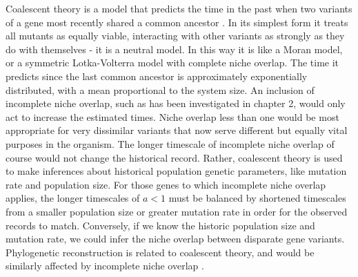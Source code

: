 Coalescent theory is a model that predicts the time in the past when two variants of a gene most recently shared a common ancestor \cite{Kingman1982,Rouzine2001,Blythe2007,Rogers2014}. 
In its simplest form it treats all mutants as equally viable, interacting with other variants as strongly as they do with themselves \cite{Ricklefs2006,Rosindell2011} - it is a neutral model. %
In this way it is like a Moran model, or a symmetric Lotka-Volterra model with complete niche overlap. 
The time it predicts since the last common ancestor is approximately exponentially distributed, with a mean proportional to the system size. %
An inclusion of incomplete niche overlap, such as has been investigated in chapter 2, would only act to increase the estimated times. 
Niche overlap less than one would be most appropriate for very dissimilar variants that now serve different but equally vital purposes in the organism. 
The longer timescale of incomplete niche overlap of course would not change the historical record. 
Rather, coalescent theory is used to make inferences about historical population genetic parameters, like mutation rate and population size. 
For those genes to which incomplete niche overlap applies, the longer timescales of $a<1$ must be balanced by shortened timescales from a smaller population size or greater mutation rate in order for the observed records to match. 
Conversely, if we know the historic population size and mutation rate, we could infer the niche overlap between disparate gene variants. 
Phylogenetic reconstruction is related to coalescent theory, and would be similarly affected by incomplete niche overlap \cite{Ricklefs2006}. %


